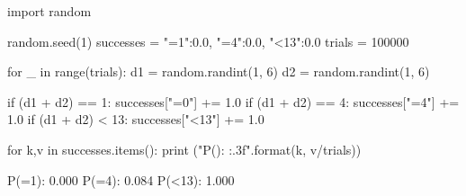 \cprotEnv\begin{solution}
\begin{ipython}
import random

random.seed(1)
successes = {"=1":0.0, "=4":0.0, "<13":0.0}
trials = 100000

for _ in range(trials):
    d1 = random.randint(1, 6)
    d2 = random.randint(1, 6)

    if (d1 + d2) == 1:
        successes["=0"] += 1.0
    if (d1 + d2) == 4:
        successes["=4"] += 1.0
    if (d1 + d2) < 13:
        successes["<13"] += 1.0

for k,v in successes.items():
    print ("P({}): {:.3f}".format(k, v/trials))
\end{ipython}
\begin{ioutput}
P(=1): 0.000
P(=4): 0.084
P(<13): 1.000
\end{ioutput}
\end{solution}

